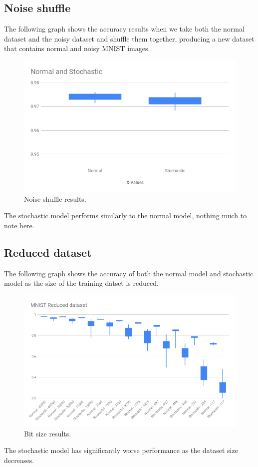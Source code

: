 \documentclass[a4paper,oneside,phd,etd]{BYUPhys}
\begin{document}
\vfill
\subsection{Noise shuffle}
The following graph shows the accuracy results when we take both the normal dataset and the noisy dataset and shuffle them together, producing a new dataset that contains normal and noisy MNIST images.
\begin{figure}[H]
\centering
\includegraphics[width=16cm]{results/noise_shuffle.png}
\caption{Noise shuffle results.}
\label{fig:noise_shuffle}
\end{figure}
The stochastic model performs similarly to the normal model, nothing much to note here.

\vfill
\subsection{Reduced dataset}
The following graph shows the accuracy of both the normal model and stochastic model as the size of the training datset is reduced.
\begin{figure}[H]
\centering
\includegraphics[width=16cm]{results/reduced_dataset.png}
\caption{Bit size results.}
\label{fig:dataset}
\end{figure}
The stochastic model has significantly worse performance as the dataset size decreases.
\end{document}

